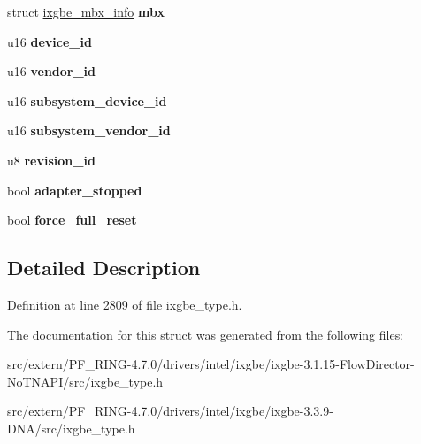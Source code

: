 \begin{DoxyCompactItemize}
\item 
\hypertarget{structixgbe__hw_a7740bbb42ff9d1a8c475e06df1fcc20e}{
struct \hyperlink{structixgbe__mbx__info}{ixgbe\_\-mbx\_\-info} {\bfseries mbx}}
\label{structixgbe__hw_a7740bbb42ff9d1a8c475e06df1fcc20e}

\item 
\hypertarget{structixgbe__hw_a76379c023349a36f77cb5348559288ab}{
u16 {\bfseries device\_\-id}}
\label{structixgbe__hw_a76379c023349a36f77cb5348559288ab}

\item 
\hypertarget{structixgbe__hw_a459951a2dc0f350f2a6535ba05cf7af9}{
u16 {\bfseries vendor\_\-id}}
\label{structixgbe__hw_a459951a2dc0f350f2a6535ba05cf7af9}

\item 
\hypertarget{structixgbe__hw_ac60182e71b6f7e6c28853beef9701946}{
u16 {\bfseries subsystem\_\-device\_\-id}}
\label{structixgbe__hw_ac60182e71b6f7e6c28853beef9701946}

\item 
\hypertarget{structixgbe__hw_a5e80e92775fc4894540895e8a8942497}{
u16 {\bfseries subsystem\_\-vendor\_\-id}}
\label{structixgbe__hw_a5e80e92775fc4894540895e8a8942497}

\item 
\hypertarget{structixgbe__hw_a477db966618211594078fb00757bb69c}{
u8 {\bfseries revision\_\-id}}
\label{structixgbe__hw_a477db966618211594078fb00757bb69c}

\item 
\hypertarget{structixgbe__hw_a2182a35a3d4d23339ad65dfae72ffe8a}{
bool {\bfseries adapter\_\-stopped}}
\label{structixgbe__hw_a2182a35a3d4d23339ad65dfae72ffe8a}

\item 
\hypertarget{structixgbe__hw_af8dfb9a67db2807bf0f614ba9e714eb5}{
bool {\bfseries force\_\-full\_\-reset}}
\label{structixgbe__hw_af8dfb9a67db2807bf0f614ba9e714eb5}

\end{DoxyCompactItemize}


\subsection{Detailed Description}


Definition at line 2809 of file ixgbe\_\-type.h.



The documentation for this struct was generated from the following files:\begin{DoxyCompactItemize}
\item 
src/extern/PF\_\-RING-\/4.7.0/drivers/intel/ixgbe/ixgbe-\/3.1.15-\/FlowDirector-\/NoTNAPI/src/ixgbe\_\-type.h\item 
src/extern/PF\_\-RING-\/4.7.0/drivers/intel/ixgbe/ixgbe-\/3.3.9-\/DNA/src/ixgbe\_\-type.h\end{DoxyCompactItemize}
